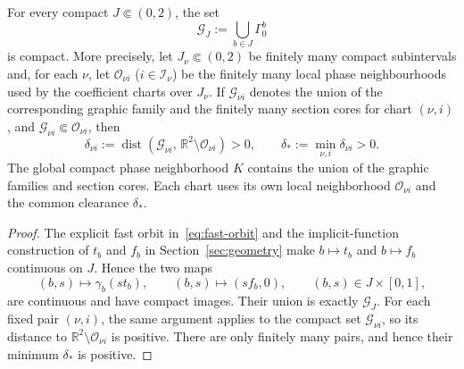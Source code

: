 \begin{lemma}
\label{lem:compact-graphic-family}
For every compact $J\Subset(0,2)$, the set
\[
 \mathcal G_J:=\bigcup_{b\in J}\Gamma_0^b
\]
is compact.  More precisely, let $J_\nu\Subset(0,2)$ be finitely many
compact subintervals and, for each $\nu$, let
$\mathcal O_{\nu i}$ ($i\in\mathcal I_\nu$) be the finitely many local phase
neighbourhoods used by the coefficient charts over $J_\nu$.  If
$\mathcal G_{\nu i}$ denotes the union of the corresponding graphic
family and the finitely many section cores for chart $(\nu,i)$, and
$\mathcal G_{\nu i}\Subset\mathcal O_{\nu i}$, then
\[
 \delta_{\nu i}:=\operatorname{dist}
   (\mathcal G_{\nu i},\,\mathbb R^2\setminus\mathcal O_{\nu i})>0,
 \qquad
 \delta_*:=\min_{\nu,i}\delta_{\nu i}>0.
\]
The global compact phase neighborhood $K$ contains the union of the
graphic families and section cores. Each chart uses its own local
neighborhood $\mathcal O_{\nu i}$ and the common clearance $\delta_*$.
\end{lemma}
\begin{proof}
The explicit fast orbit in~\eqref{eq:fast-orbit} and the implicit-function
construction of $t_b$ and $f_b$ in Section~\ref{sec:geometry} make
$b\mapsto t_b$ and $b\mapsto f_b$ continuous on $J$.  Hence the two maps
\[
 (b,s)\longmapsto \gamma_b(st_b),\qquad
 (b,s)\longmapsto (sf_b,0),
 \qquad (b,s)\in J\times[0,1],
\]
are continuous and have compact images. Their union is exactly
$\mathcal G_J$.  For each fixed pair $(\nu,i)$, the same argument applies
to the compact set $\mathcal G_{\nu i}$, so its distance to
 $\mathbb R^2\setminus\mathcal O_{\nu i}$ is positive.  There are only finitely many
pairs, and hence their minimum $\delta_*$ is positive.
\end{proof}

